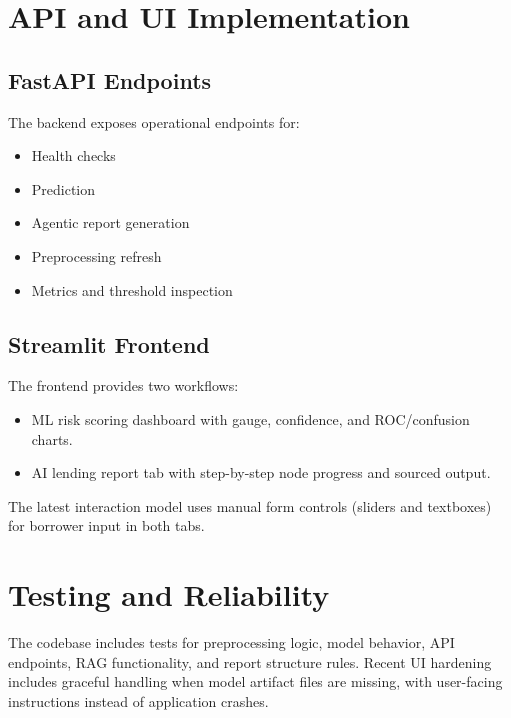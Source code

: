 \documentclass[12pt,a4paper]{article}
\begin{document}
\section{API and UI Implementation}
\subsection{FastAPI Endpoints}
The backend exposes operational endpoints for:
\begin{itemize}[leftmargin=1.5em]
  \item Health checks
  \item Prediction
  \item Agentic report generation
  \item Preprocessing refresh
  \item Metrics and threshold inspection
\end{itemize}

\subsection{Streamlit Frontend}
The frontend provides two workflows:
\begin{itemize}[leftmargin=1.5em]
  \item ML risk scoring dashboard with gauge, confidence, and ROC/confusion charts.
  \item AI lending report tab with step-by-step node progress and sourced output.
\end{itemize}

The latest interaction model uses manual form controls (sliders and textboxes) for borrower input in both tabs.

\section{Testing and Reliability}
The codebase includes tests for preprocessing logic, model behavior, API endpoints, RAG functionality, and report structure rules. Recent UI hardening includes graceful handling when model artifact files are missing, with user-facing instructions instead of application crashes.
\end{document}
